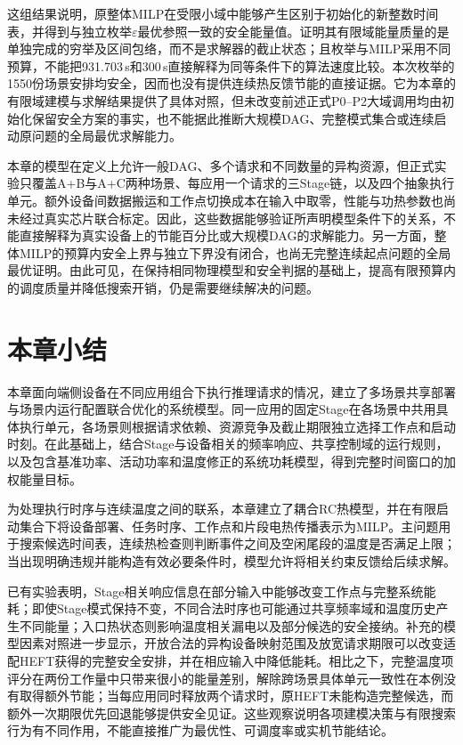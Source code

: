 这组结果说明，原整体MILP在受限小域中能够产生区别于初始化的新整数时间表，并得到与独立枚举$\varepsilon$最优参照一致的安全能量值。证明其有限域能量质量的是单独完成的穷举及区间包络，而不是求解器的截止状态；且枚举与MILP采用不同预算，不能把931.703\,s和300\,s直接解释为同等条件下的算法速度比较。本次枚举的1550份场景安排均安全，因而也没有提供连续热反馈节能的直接证据。它为本章的有限域建模与求解结果提供了具体对照，但未改变前述正式P0--P2大域调用均由初始化保留安全方案的事实，也不能据此推断大规模DAG、完整模式集合或连续启动原问题的全局最优求解能力。

本章的模型在定义上允许一般DAG、多个请求和不同数量的异构资源，但正式实验只覆盖A+B与A+C两种场景、每应用一个请求的三Stage链，以及四个抽象执行单元。额外设备间数据搬运和工作点切换成本在输入中取零，性能与功热参数也尚未经过真实芯片联合标定。因此，这些数据能够验证所声明模型条件下的关系，不能直接解释为真实设备上的节能百分比或大规模DAG的求解能力。另一方面，整体MILP的预算内安全上界与独立下界没有闭合，也尚无完整连续起点问题的全局最优证明。由此可见，在保持相同物理模型和安全判据的基础上，提高有限预算内的调度质量并降低搜索开销，仍是需要继续解决的问题。

\section{本章小结}

本章面向端侧设备在不同应用组合下执行推理请求的情况，建立了多场景共享部署与场景内运行配置联合优化的系统模型。同一应用的固定Stage在各场景中共用具体执行单元，各场景则根据请求依赖、资源竞争及截止期限独立选择工作点和启动时刻。在此基础上，结合Stage与设备相关的频率响应、共享控制域的运行规则，以及包含基准功率、活动功率和温度修正的系统功耗模型，得到完整时间窗口的加权能量目标。

为处理执行时序与连续温度之间的联系，本章建立了耦合RC热模型，并在有限启动集合下将设备部署、任务时序、工作点和片段电热传播表示为MILP。主问题用于搜索候选时间表，连续热检查则判断事件之间及空闲尾段的温度是否满足上限；当出现明确违规并能构造有效必要条件时，模型允许将相关约束反馈给后续求解。

已有实验表明，Stage相关响应信息在部分输入中能够改变工作点与完整系统能耗；即使Stage模式保持不变，不同合法时序也可能通过共享频率域和温度历史产生不同能量；入口热状态则影响温度相关漏电以及部分候选的安全接纳。补充的模型因素对照进一步显示，开放合法的异构设备映射范围及放宽请求期限可以改变适配HEFT获得的完整安全安排，并在相应输入中降低能耗。相比之下，完整温度项评分在两份工作量中只带来很小的能量差别，解除跨场景具体单元一致性在本例没有取得额外节能；当每应用同时释放两个请求时，原HEFT未能构造完整候选，而额外一次期限优先回退能够提供安全见证。这些观察说明各项建模决策与有限搜索行为有不同作用，不能直接推广为最优性、可调度率或实机节能结论。

